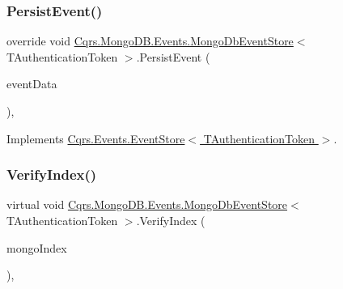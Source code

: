 \mbox{\label{classCqrs_1_1MongoDB_1_1Events_1_1MongoDbEventStore_a13f6823671d7cb9c042d8f7156a51b89_a13f6823671d7cb9c042d8f7156a51b89}} 
\subsubsection{\texorpdfstring{Persist\+Event()}{PersistEvent()}}
{\footnotesize\ttfamily override void \hyperlink{classCqrs_1_1MongoDB_1_1Events_1_1MongoDbEventStore}{Cqrs.\+Mongo\+D\+B.\+Events.\+Mongo\+Db\+Event\+Store}$<$ T\+Authentication\+Token $>$.Persist\+Event (\begin{DoxyParamCaption}\item[{\hyperlink{classCqrs_1_1Events_1_1EventData}{Event\+Data}}]{event\+Data }\end{DoxyParamCaption})\hspace{0.3cm}{\ttfamily [protected]}, {\ttfamily [virtual]}}



Implements \hyperlink{classCqrs_1_1Events_1_1EventStore_aedb71ca0ddf21220e323bc60ad7508cd_aedb71ca0ddf21220e323bc60ad7508cd}{Cqrs.\+Events.\+Event\+Store$<$ T\+Authentication\+Token $>$}.

\mbox{\label{classCqrs_1_1MongoDB_1_1Events_1_1MongoDbEventStore_a6a6f0303cd412974d90be87d281e81f5_a6a6f0303cd412974d90be87d281e81f5}} 
\subsubsection{\texorpdfstring{Verify\+Index()}{VerifyIndex()}}
{\footnotesize\ttfamily virtual void \hyperlink{classCqrs_1_1MongoDB_1_1Events_1_1MongoDbEventStore}{Cqrs.\+Mongo\+D\+B.\+Events.\+Mongo\+Db\+Event\+Store}$<$ T\+Authentication\+Token $>$.Verify\+Index (\begin{DoxyParamCaption}\item[{\hyperlink{classCqrs_1_1MongoDB_1_1DataStores_1_1Indexes_1_1MongoDbIndex}{Mongo\+Db\+Index}$<$ \hyperlink{classCqrs_1_1MongoDB_1_1Events_1_1MongoDbEventData}{Mongo\+Db\+Event\+Data} $>$}]{mongo\+Index }\end{DoxyParamCaption})\hspace{0.3cm}{\ttfamily [protected]}, {\ttfamily [virtual]}}


